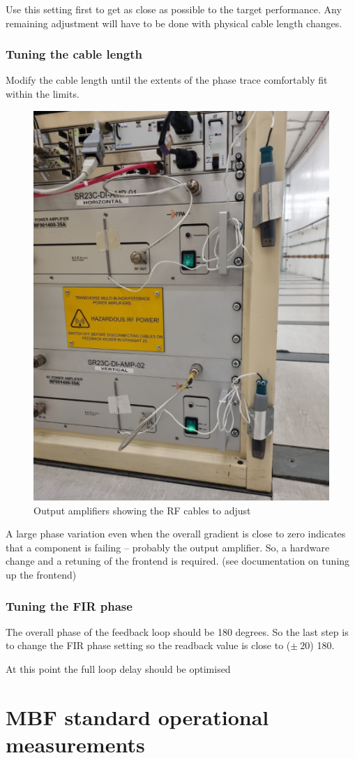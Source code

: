\documentclass{report}
\begin{document}
Use this setting first to get as close as possible to the target performance. Any remaining adjustment will have to be done with physical cable length changes. 
\clearpage
\subsubsection{Tuning the cable length} 
Modify the cable length until the extents of the phase trace comfortably fit within the limits.  
\begin{figure}[ht]
    \centering
    \includegraphics[width=0.6\linewidth]{amp_front.png}
    \caption{Output amplifiers showing the RF cables to adjust}
    \label{fig:output_amplifiers}
\end{figure}
A large phase variation even when the overall gradient is close to zero indicates that a component is failing – probably the output amplifier. So, a hardware change and a retuning of the frontend is required. (see documentation on tuning up the frontend)
\subsubsection{Tuning the FIR phase}
The overall phase of the feedback loop should be 180 degrees. So the last step is to change the FIR phase setting so the readback value is close to ($\pm~20$) 180.

At this point the full loop delay should be optimised
\clearpage

\section{MBF standard operational measurements}
\end{document}
